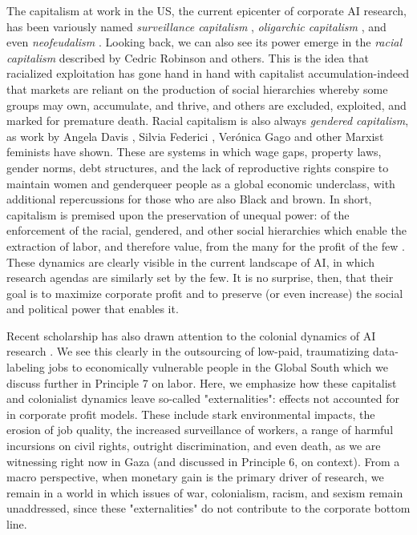 The capitalism at work in the US, the current epicenter of corporate AI research, has been variously named \textit{surveillance capitalism} \cite{Zuboff_2019}, \textit{oligarchic capitalism} \cite{Foweraker_2021}, and even \textit{neofeudalism} \cite{Dean_2021}. Looking back, we can also see its power emerge in the \textit{racial capitalism} described by Cedric Robinson and others. This is the idea that racialized exploitation has gone hand in hand with capitalist accumulation-indeed that markets are reliant on the production of social hierarchies whereby some groups may own, accumulate, and thrive, and others are excluded, exploited, and marked for premature death. Racial capitalism is also always \textit{gendered capitalism}, as work by Angela Davis \cite{Davis_2011}, Silvia Federici \cite{Federici_2022}, Verónica Gago \cite{Gago_2017} and other Marxist feminists have shown. These are systems in which wage gaps, property laws, gender norms, debt structures, and the lack of reproductive rights conspire to maintain women and genderqueer people as a global economic underclass, with additional repercussions for those who are also Black and brown. In short, capitalism is premised upon the preservation of unequal power: of the enforcement of the racial, gendered, and other social hierarchies which enable the extraction of labor, and therefore value, from the many for the profit of the few \cite{Couldry_Mejias_2019}. These dynamics are clearly visible in the current landscape of AI, in which research agendas are similarly set by the few. It is no surprise, then, that their goal is to maximize corporate profit and to preserve (or even increase) the social and political power that enables it. 

Recent scholarship has also drawn attention to the colonial dynamics of AI research \cite{Couldry_2019, Tacheva_Ramasubramanian_2023, Ricaurte2019}. We see this clearly in the outsourcing of low-paid, traumatizing data-labeling jobs to economically vulnerable people in the Global South which we discuss further in Principle 7 on labor. Here, we emphasize how these capitalist and colonialist dynamics leave so-called "externalities": effects not accounted for in corporate profit models. These include stark environmental impacts, the erosion of job quality, the increased surveillance of workers, a range of harmful incursions on civil rights, outright discrimination, and even death, as we are witnessing right now in Gaza (and discussed in Principle 6, on context). From a macro perspective, when monetary gain is the primary driver of research, we remain in a world in which issues of war, colonialism, racism, and sexism remain unaddressed, since these "externalities" do not contribute to the corporate bottom line. 

